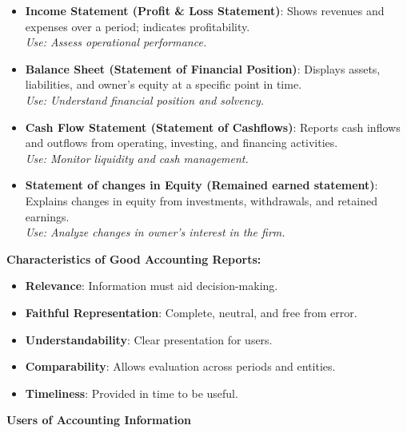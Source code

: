 \documentclass[12pt,a4paper]{book}
\begin{document}
\begin{itemize}
    \item \textbf{Income Statement (Profit \& Loss Statement)}: Shows revenues and expenses over a period; indicates profitability.\\
    \textit{Use: Assess operational performance.}
    
    \item \textbf{Balance Sheet (Statement of Financial Position)}: Displays assets, liabilities, and owner’s equity at a specific point in time.\\
    \textit{Use: Understand financial position and solvency.}
    
    \item \textbf{Cash Flow Statement (Statement of Cashflows)}: Reports cash inflows and outflows from operating, investing, and financing activities.\\
    \textit{Use: Monitor liquidity and cash management.}
    
    \item \textbf{Statement of changes in Equity (Remained earned statement)}: Explains changes in equity from investments, withdrawals, and retained earnings.\\
    \textit{Use: Analyze changes in owner’s interest in the firm.}
\end{itemize}

\textbf{Characteristics of Good Accounting Reports:}
\begin{itemize}
    \item \textbf{Relevance}: Information must aid decision-making.
    \item \textbf{Faithful Representation}: Complete, neutral, and free from error.
    \item \textbf{Understandability}: Clear presentation for users.
    \item \textbf{Comparability}: Allows evaluation across periods and entities.
    \item \textbf{Timeliness}: Provided in time to be useful.
\end{itemize}

\vspace{0.5cm}
\textbf{Users of Accounting Information}
\end{document}
